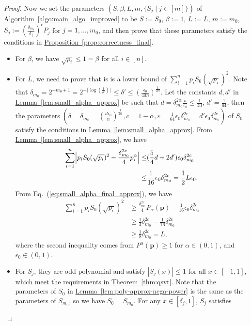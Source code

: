 \documentclass[journal]{IEEEtran}
\newcommand{\eq}[1]{Eq.~(\ref{eq:#1})}
\newcommand{\thm}[1]{\hyperref[thm:#1]{Theorem~\ref*{thm:#1}}}
\newcommand{\lem}[1]{\hyperref[lem:#1]{Lemma~\ref*{lem:#1}}}
\newcommand{\prop}[1]{\hyperref[prop:#1]{Proposition~\ref*{prop:#1}}}
\newcommand{\algo}[1]{\hyperref[algo:#1]{Algorithm~\ref*{algo:#1}}}
\begin{document}
\begin{proof}
    Now we set the parameters $(S, \beta,L,m,\{S_j\mid j\in[m]\})$ of \algo{main_algo_improved} to be $S:=S_0$, $\beta := 1$, $L:=L$, $m:=m_0$, $S_j := \left(\frac{\delta_{m_0}}{\delta_j}\right)^{c}P_j$ for $j = 1,\ldots,m_0$, and then prove that these parameters satisfy the conditions in \prop{correctness_final}.
    \begin{itemize}[leftmargin=*]
    \item For $\beta$, we have $\sqrt{p_i} \le 1 =\beta$ for all $i\in[n]$.
        \item For $L$, we need to prove that is is a lower bound of $\sum_{i=1}^n p_i S_0(\sqrt{p_i})^2$.
  Note that $\delta_{m_0} = 2^{-m_0+1} = 2^{-\lceil \log(\frac{1}{\delta'})\rceil} \le \delta'\le \left(\frac{\epsilon_{0}}{40n}\right)^{\frac{1}{2\alpha}}$. Let the constants $d,d'$ in \lem{small_alpha_approx} be such that $d = \delta_{m_0}^{2\alpha}\frac{n}{\epsilon_{0}} \le \frac{1}{40}$, $d' = \frac{1}{64}$, then the parameters $(\delta = \delta_{m_0} = \left(\frac{d\epsilon_0}{n}\right)^{\frac{1}{2\alpha}}, c=1-\alpha,\varepsilon=\frac{1}{64}\epsilon_{0} \delta_{m_0}^{2c}= d'\epsilon_0\delta_{m_0}^{2c})$ of $S_0$ satisfy the conditions in \lem{small_alpha_approx}. From \lem{small_alpha_approx}, we have
  \begin{align}
    \label{eq:small_alpha_final_approx}
    \sum_{i=1}^n \Bigl|p_iS_0(\sqrt{p_i})^2-\frac{\delta_{m_0}^{2c}}{4}p_i^{\alpha}\Bigr| \le & (\frac{5}{4}d + 2d')\epsilon_{0} \delta_{m_0}^{2c} \nonumber \\ 
    \le & \frac{1}{16}\epsilon_{0} \delta_{m_0}^{2c} = \frac{1}{2}L\epsilon_{0}.
  \end{align}
From \eq{small_alpha_final_approx}, we have
    \begin{align}
        \sum_{i=1}^n p_iS_0(\sqrt{p_i})^2 &\ge  \frac{\delta_{m_0}^{2c}}{4}P_{\alpha}(\mathbf{p}) - \frac{1}{16} \epsilon_{0} \delta_{m_0}^{2c} \nonumber\\ 
        &\ge \frac{1}{4}\delta_{m_0}^{2c}-\frac{1}{16}\delta_{m_0}^{2c}\nonumber\\
        &\ge  \frac{1}{8}\delta_{m_0}^{2c} = L,
    \end{align}
    where the second inequality comes from $P^{\alpha}(\mathbf{p}) \ge 1$ for $\alpha\in(0,1)$, and $\epsilon_{0} \in (0,1)$.
    \item For $S_j$, they are odd polynomial and satisfy $|S_j(x)| \le 1$ for all $x\in[-1,1]$, which meet the requirements in \thm{qsvt}.
    Note that the parameters of $S_0$ in \lem{poly-approx-nega-power} is the same as the parameters of $S_{m_0}$, so we have $S_0 = S_{m_0}$. For any $x\in [\delta_j,1]$, $S_j$ satisfies

\end{itemize}
\end{proof}
\end{document}
